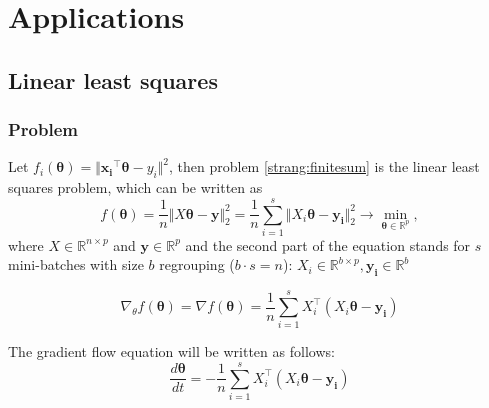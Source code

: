 \documentclass{article}
\newcommand{\vect}[1]{\boldsymbol{\mathbf{#1}}}
\begin{document}

\section{Applications}
\subsection{Linear least squares}
\subsubsection{Problem}
Let $f_i(\vect{\theta}) = \Vert \vect{x_i}^{\top} \vect{\theta} - y_i \Vert^2$, then problem \eqref{strang:finitesum} is the linear least squares problem, which can be written as
\begin{equation}\label{strang:LLS}
   f(\vect{\theta}) = \frac{1}{n}\Vert X \vect{\theta} - \vect{y} \Vert_2^2  = \frac{1}{n}\sum\limits_{i=1}^s\Vert X_i \vect{\theta} - \vect{y_i} \Vert_2^2\to \min_{\vect{\theta} \in \mathbb{R}^p},
\end{equation}
where $X \in \mathbb{R}^{n \times p}$ and $\vect{y} \in \mathbb{R}^p$ and the second part of the equation stands for $s$ mini-batches with size $b$ regrouping ($b \cdot s = n$): $X_i \in \mathbb{R}^{b \times p}, \vect{y_i} \in \mathbb{R}^{b}$

\begin{equation}\label{strang:LLS_grad}
\nabla_\theta f(\vect{\theta}) = \nabla f(\vect{\theta}) = \frac{1}{n}\sum\limits_{i=1}^s X_i^\top(X_i \vect{\theta} - \vect{y_i})
\end{equation}

The gradient flow equation will be written as follows:
\begin{equation}\label{strang:LLS_GF}
\frac{d \vect{\theta}}{d t} = - \frac{1}{n}\sum\limits_{i=1}^s X_i^\top( X_i \vect{\theta} - \vect{y_i})
\end{equation}
\end{document}
